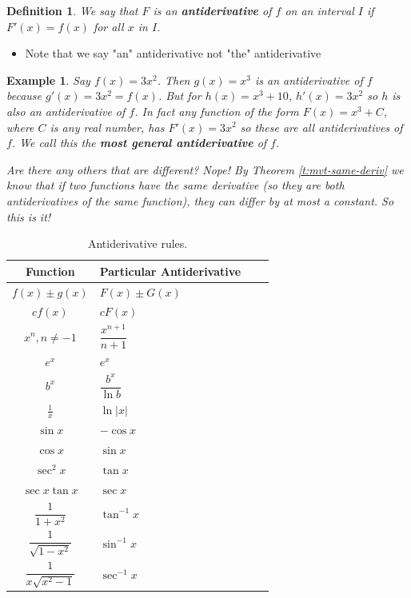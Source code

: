 \documentclass[letterpaper, 11pt, openany]{book}
\theoremstyle{mytheoremstyle}
\newtheorem{definition}{Definition}[section]
\theoremstyle{myexamplestyle}
\newtheorem{example}{Example}[section]
\begin{document}
\begin{definition}\label{d:antiderivative}
    We say that \(F\) is an \textbf{antiderivative} of \(f\) on an interval \(I\) if \(F'(x) = f(x)\) for all \(x\) in \(I\).
\end{definition}
\begin{itemize}
    \item Note that we say "an" antiderivative not "the" antiderivative
\end{itemize}
\begin{example}
    Say \(f(x) = 3x^{2}\). Then \(g(x) = x^{3}\) is an antiderivative of \(f\) because \(g'(x) = 3x^{2} = f(x)\). But for \(h(x) = x^{3} + 10\), \(h'(x) = 3x^{2}\) so \(h\) is also an antiderivative of \(f\). In fact any function of the form \(F(x) = x^{3} + C\), where \(C\) is any real number, has \(F'(x) = 3x^{2}\) so these are all antiderivatives of \(f\). We call this the \textbf{most general antiderivative} of \(f\).

    Are there any others that are different? Nope! By Theorem \ref{t:mvt-same-deriv} we know that if two functions have the same derivative (so they are both antiderivatives of the same function), they can differ by at most a constant. So this is it! \faSmile
\end{example}


\begin{table}[htbp]
    \centering\begin{tabular}{Sl Sl}
        \textbf{Function} & \textbf{Particular Antiderivative} \\ \hline
        \(f(x) \pm g(x)\)   & \(F(x) \pm G(x)\)\\
        \(cf(x)\)   & \(cF(x)\)\\
        \(x^{n}, n \neq -1\)    & \(\dfrac{x^{n+1}}{n+1}\)\\
        \(e^x\) & \(e^x\)\\
        \(b^x\) & \(\dfrac{b^x}{\ln b}\)\\
        \(\frac{1}{x}\) & \(\ln |x|\)\\
        \(\sin x\) & \(-\cos x\)\\
        \(\cos x\) & \(\sin x\)\\
        \(\sec^2 x\) & \(\tan x\)\\
        \(\sec x \tan x\) & \(\sec x\)\\
        \(\dfrac{1}{1 + x^2}\) & \(\tan^{-1} x\)\\
        \(\dfrac{1}{\sqrt{1 - x^2}}\) & \(\sin^{-1} x\)\\
        \(\dfrac{1}{x\sqrt{x^2 - 1}}\) & \(\sec^{-1} x\)\\ \hline
    \end{tabular}
    \caption{Antiderivative rules.}
    \label{tb:antiderivative}
\end{table}
\end{document}
